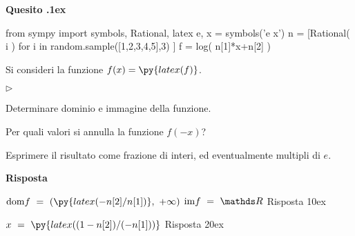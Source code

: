 \documentclass[11pt,twoside,a4paper]{article}
\newcommand{\mylabel}[1]{#1\hfill}
\renewenvironment{itemize}
  {\begin{list}{$\triangleright$}{%
   \setlength{\parskip}{0mm}
   \setlength{\topsep}{.4\baselineskip}
   \setlength{\rightmargin}{0mm}
   \setlength{\listparindent}{0mm}
   \setlength{\itemindent}{0mm}
   \setlength{\labelwidth}{2ex}
   \setlength{\itemsep}{.4\baselineskip}
   \setlength{\parsep}{0mm}
   \setlength{\partopsep}{0mm}
   \setlength{\labelsep}{1ex}
   \setlength{\leftmargin}{\labelwidth+\labelsep}
   \let\makelabel\mylabel}}{%
   \end{list}\vspace*{-1.3mm}}
\newcounter{quesito}
\newenvironment{question}{\addtocounter{quesito}{1}\par\textbf{Quesito \thequesito.\kern1ex}}{\vspace{0.5\parskip}}
\newenvironment{answer}{\par\textbf{Risposta\quad}}{\vspace{\parskip}}
\begin{document}
\begin{question}
\def\RR{{\mathds R}}
\def\dom{{\rm dom}}
\def\range{{\rm im}}
\begin{pycode}
from sympy import symbols, Rational, latex
e, x = symbols('e x')
n = [Rational( i ) for i in random.sample([1,2,3,4,5],3) ]
f = log( n[1]*x+n[2] )
\end{pycode}
Si consideri la funzione $f(x) = \py{ latex(f) } $.
\begin{itemize}
\item[1.] Determinare dominio e immagine della funzione. 
\item[2.] Per quali valori si annulla la funzione $f(-x)$?
\end{itemize}
Esprimere il risultato come frazione di interi, ed eventualmente multipli di $e$.
\begin{answer}

{\color{blue}
$\displaystyle\dom f\ =\ \left(\py{latex(-n[2]/n[1])},\ +\infty\right)$
\qquad 
$\range f\ =\ \RR$
\hfill Risposta 1\kern0ex}

{\color{blue}
$\displaystyle x\ =\ \py{latex((1-n[2])/(-n[1]))}$
\hfill Risposta 2\kern0ex}

\end{answer}
\end{question}
\end{document}
